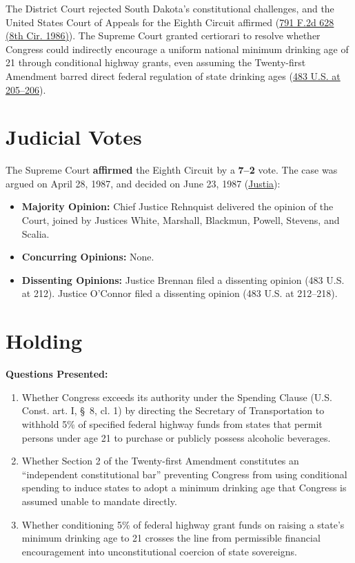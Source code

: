 \documentclass[12pt]{article}
\begin{document}
The District Court rejected South Dakota's constitutional challenges, and the United States Court of Appeals for the Eighth Circuit affirmed (\href{https://caselaw.findlaw.com/court/us-8th-circuit/114759006.html}{791 F.2d 628 (8th Cir. 1986)}). The Supreme Court granted certiorari to resolve whether Congress could indirectly encourage a uniform national minimum drinking age of 21 through conditional highway grants, even assuming the Twenty-first Amendment barred direct federal regulation of state drinking ages (\href{https://supreme.justia.com/cases/federal/us/483/203/}{483 U.S. at 205--206}).

\section{Judicial Votes}
The Supreme Court \textbf{affirmed} the Eighth Circuit by a \textbf{7--2} vote. The case was argued on April 28, 1987, and decided on June 23, 1987 (\href{https://supreme.justia.com/cases/federal/us/483/203/}{Justia}):

\begin{itemize}
    \item \textbf{Majority Opinion:} Chief Justice Rehnquist delivered the opinion of the Court, joined by Justices White, Marshall, Blackmun, Powell, Stevens, and Scalia.
    \item \textbf{Concurring Opinions:} None.
    \item \textbf{Dissenting Opinions:} Justice Brennan filed a dissenting opinion (483 U.S. at 212). Justice O'Connor filed a dissenting opinion (483 U.S. at 212--218).
\end{itemize}

\section{Holding}
\textbf{Questions Presented:}

\begin{enumerate}
  \item Whether Congress exceeds its authority under the Spending Clause (U.S. Const. art. I, \S~8, cl. 1) by directing the Secretary of Transportation to withhold 5\% of specified federal highway funds from states that permit persons under age 21 to purchase or publicly possess alcoholic beverages.
  \item Whether Section 2 of the Twenty-first Amendment constitutes an ``independent constitutional bar'' preventing Congress from using conditional spending to induce states to adopt a minimum drinking age that Congress is assumed unable to mandate directly.
  \item Whether conditioning 5\% of federal highway grant funds on raising a state's minimum drinking age to 21 crosses the line from permissible financial encouragement into unconstitutional coercion of state sovereigns.
\end{enumerate}
\end{document}
